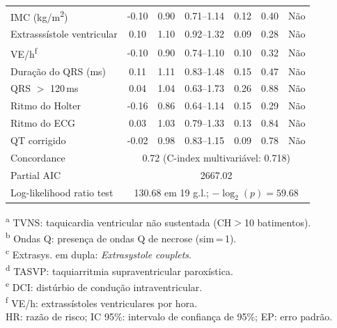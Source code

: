 \begin{table}[htbp]
{\begin{tabular}{lcccccc}
			IMC (kg/m\textsuperscript{2})
			           & -0.10                                                         & 0.90 & 0.71--1.14 & 0.12 & 0.40     & N\~ao           \\
			Extrasss\'istole ventricular
			           & 0.10                                                          & 1.10 & 0.92--1.32 & 0.09 & 0.28     & N\~ao           \\
			VE/h\textsuperscript{f}
			           & -0.10                                                         & 0.90 & 0.74--1.10 & 0.10 & 0.32     & N\~ao           \\
			Dura\c{c}\~ao do QRS (ms)
			           & 0.11                                                          & 1.11 & 0.83--1.48 & 0.15 & 0.47     & N\~ao           \\
			QRS $>$ 120\,ms
			           & 0.04                                                          & 1.04 & 0.63--1.73 & 0.26 & 0.88     & N\~ao           \\
			Ritmo do Holter
			           & -0.16                                                         & 0.86 & 0.64--1.14 & 0.15 & 0.29     & N\~ao           \\
			Ritmo do ECG
			           & 0.03                                                          & 1.03 & 0.79--1.33 & 0.13 & 0.84     & N\~ao           \\
			QT corrigido
			           & -0.02                                                         & 0.98 & 0.83--1.15 & 0.09 & 0.78     & N\~ao           \\
			\midrule
			Concordance
			           & \multicolumn{6}{c}{0.72 \quad (C-index multivariável: 0.718)}                                                         \\
			Partial AIC
			           & \multicolumn{6}{c}{2667.02}                                                                                           \\
			Log-likelihood ratio test
			           & \multicolumn{6}{c}{130.68 em 19 g.l.; $-\log_2(p)=59.68$}                                                             \\
			\bottomrule
		\end{tabular}%
	}
	\begin{flushleft}
		\footnotesize
		\textsuperscript{a} TVNS: taquicardia ventricular não sustentada (CH$>$10 batimentos).\\
		\textsuperscript{b} Ondas Q: presença de ondas Q de necrose (sim\,=\,1).\\
		\textsuperscript{c} Extrasys. em dupla: \textit{Extrasystole couplets}.\\
		\textsuperscript{d} TASVP: taquiarritmia supraventricular paroxística.\\
		\textsuperscript{e} DCI: distúrbio de condução intraventricular.\\
		\textsuperscript{f} VE/h: extrassístoles ventriculares por hora.\\
		HR: razão de risco; IC 95\%: intervalo de confiança de 95\%; EP: erro padrão.
	\end{flushleft}
\end{table}

